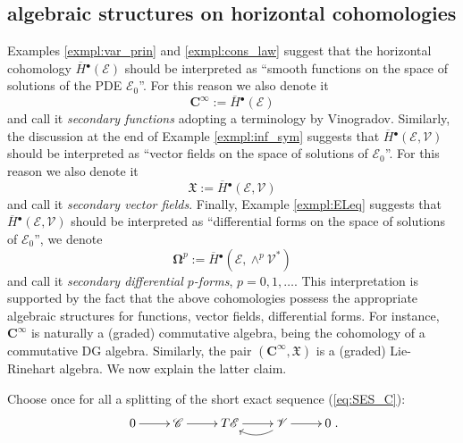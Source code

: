 \documentclass{conm-p-l}
\theoremstyle{definition}
\theoremstyle{remark}
\numberwithin{equation}{section}
\begin{document}
\subsection{algebraic structures on horizontal cohomologies}\label{Subsec:LR}
 Examples \ref{exmpl:var_prin} and \ref{exmpl:cons_law} suggest that the horizontal cohomology $\overline H{}^\bullet (\mathscr E)$ should be interpreted as ``smooth functions on the space of solutions of the PDE $\mathscr E_0$''. For this reason we also denote it
 \[
 \boldsymbol C^\infty := \overline H{}^\bullet (\mathscr E)
 \] 
 and call it \emph{secondary functions} adopting a terminology by Vinogradov. Similarly, the discussion at the end of Example \ref{exmpl:inf_sym} suggests that $\overline H{}^\bullet (\mathscr E, \mathscr V)$ should be interpreted as ``vector fields on the space of solutions of $\mathscr E_0$''. For this reason we also denote it
 \[
 \boldsymbol{\mathfrak X} := \overline H{}^\bullet (\mathscr E, \mathscr V)
 \]
 and call it \emph{secondary vector fields}. Finally, Example \ref{exmpl:ELeq} suggests that $\overline H{}^\bullet (\mathscr E, \mathscr V)$ should be interpreted as ``differential forms on the space of solutions of $\mathscr E_0$'', we denote
 \[
 \boldsymbol{\Omega}^p := \overline H{}^\bullet (\mathscr E, \wedge^p \mathscr V^\ast)
 \]
 and call it \emph{secondary differential $p$-forms}, $p = 0, 1, \ldots$. This interpretation is supported by the fact that the above cohomologies possess the appropriate algebraic structures for functions, vector fields, differential forms. For instance, $\boldsymbol C^\infty$ is naturally a (graded) commutative algebra, being the cohomology of a  commutative DG algebra. Similarly, the pair $(\boldsymbol C^\infty, \boldsymbol{\mathfrak X})$ is a (graded) Lie-Rinehart algebra. We now explain the latter claim.
 
 Choose once for all a splitting of the short exact sequence (\ref{eq:SES_C}):
%
 \begin{equation}\label{eq:split}
 \xymatrix{0 \ar[r] & \mathscr C \ar[r] & T\mathscr E \ar[r] & \mathscr V \ar[r] \ar@/^9pt/[l]& 0
 }.
 \end{equation}
 
\end{document}

